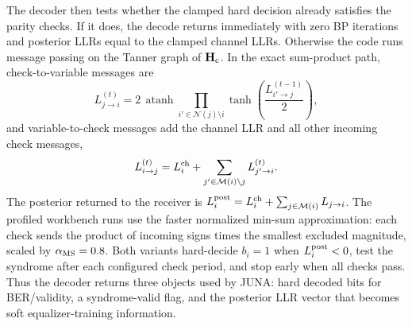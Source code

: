 \documentclass[journal]{IEEEtran}
\newcommand{\juna}{JUNA}
\newcommand{\Hc}{\mathbf H_{\rm c}}
\begin{document}
The decoder then tests whether the clamped hard decision already satisfies the
parity checks. If it does, the decode returns immediately with zero BP
iterations and posterior LLRs equal to the clamped channel LLRs. Otherwise the
code runs message passing on the Tanner graph of $\Hc$. In the exact
sum-product path, check-to-variable messages are
\begin{equation}
  L_{j\to i}^{(t)}
  =2\,\operatorname{atanh}
    \prod_{i'\in\mathcal N(j)\setminus i}
    \tanh\!\left(\frac{L_{i'\to j}^{(t-1)}}{2}\right),
  \label{eq:bp-check}
\end{equation}
and variable-to-check messages add the channel LLR and all other incoming check
messages,
\begin{equation}
  L_{i\to j}^{(t)}
  =L_i^{\rm ch}+
   \sum_{j'\in\mathcal M(i)\setminus j}L_{j'\to i}^{(t)} .
  \label{eq:bp-var}
\end{equation}
The posterior returned to the receiver is
$L_i^{\rm post}=L_i^{\rm ch}+\sum_{j\in\mathcal M(i)}L_{j\to i}$. The profiled
workbench runs use the faster normalized min-sum approximation: each check sends
the product of incoming signs times the smallest excluded magnitude, scaled by
$\alpha_{\rm MS}=0.8$. Both variants hard-decide $b_i=1$ when
$L_i^{\rm post}<0$, test the syndrome after each configured check period, and
stop early when all checks pass. Thus the decoder returns three objects used by
\juna{}: hard decoded bits for BER/validity, a syndrome-valid flag, and the
posterior LLR vector that becomes soft equalizer-training information.
\end{document}
